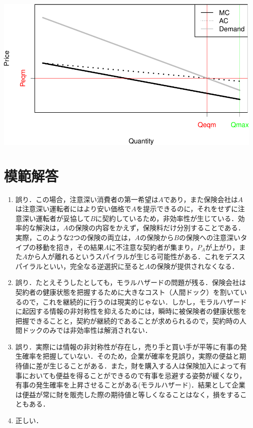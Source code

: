 \documentclass[
]{ltjarticle}
\begin{document}
\includegraphics{group-report2_files/figure-latex/unnamed-chunk-3-1.pdf}

\newpage

\hypertarget{ux6a21ux7bc4ux89e3ux7b54}{%
\section{模範解答}\label{ux6a21ux7bc4ux89e3ux7b54}}

\begin{enumerate}

\item 誤り．この場合，注意深い消費者の第一希望は$A$であり，また保険会社は$A$は注意深い運転者にはより安い価格で$A$を提示できるのに，それをせずに注意深い運転者が妥協して$B$に契約しているため，非効率性が生じている．効率的な解決は，$A$の保険の内容をかえず，保険料だけ分別することである．実際，このような2つの保険の両立は，$A$の保険から$B$の保険への注意深いタイプの移動を招き，その結果$A$に不注意な契約者が集まり，$P_A$が上がり，また$A$から人が離れるというスパイラルが生じる可能性がある．これをデススパイラルといい，完全なる逆選択に至ると$A$の保険が提供されなくなる．

\item 誤り．たとえそうしたとしても，モラルハザードの問題が残る．保険会社は契約者の健康状態を把握するために大きなコスト（人間ドック）を割いているので，これを継続的に行うのは現実的じゃない．しかし，モラルハザードに起因する情報の非対称性を抑えるためには，瞬時に被保険者の健康状態を把握できることと，契約が継続的であることが求められるので，契約時の人間ドックのみでは非効率性は解消されない．

\item 誤り．実際には情報の非対称性が存在し，売り手と買い手が平等に有事の発生確率を把握していない．そのため，企業が確率を見誤り，実際の便益と期待値に差が生じることがある．また，財を購入する人は保険加入によって有事においても便益を得ることができるので有事を忌避する姿勢が緩くなり，有事の発生確率を上昇させることがある(モラルハザード)．結果として企業は便益が常に財を販売した際の期待値と等しくなることはなく，損をすることもある．

\item 正しい．
\end{enumerate}
\end{document}

